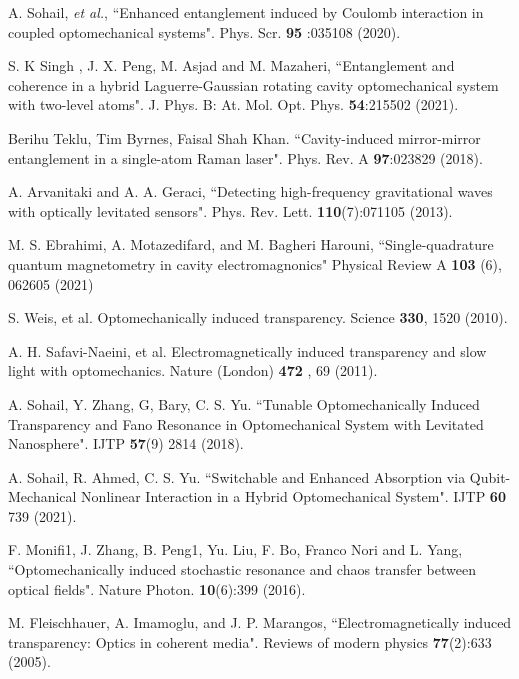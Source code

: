 \documentclass[aps,pra,superscriptaddress,balancelastpage,twocolumn]{revtex4}
\begin{document}
\begin{thebibliography}{99}
 A. Sohail, \textit{et al.}, ``Enhanced entanglement induced by
Coulomb interaction in coupled optomechanical systems". Phys. Scr. \textbf{95%
}:035108 (2020).

 S. K Singh , J. X. Peng, M. Asjad and M. Mazaheri,
``Entanglement and coherence in a hybrid Laguerre-Gaussian rotating cavity
optomechanical system with two-level atoms". J. Phys. B: At. Mol. Opt. Phys.
\textbf{54}:215502 (2021).

 Berihu Teklu, Tim Byrnes, Faisal Shah Khan. ``Cavity-induced
mirror-mirror entanglement in a single-atom Raman laser". Phys. Rev. A
\textbf{97}:023829 (2018).

 A. Arvanitaki and A. A. Geraci, ``Detecting high-frequency
gravitational waves with optically levitated sensors". Phys. Rev. Lett.
\textbf{110}(7):071105 (2013).

 M. S. Ebrahimi, A. Motazedifard, and M. Bagheri Harouni,
``Single-quadrature quantum magnetometry in cavity electromagnonics"
Physical Review A \textbf{103} (6), 062605 (2021)

 S. Weis, et al. Optomechanically induced transparency. Science
\textbf{330}, 1520 (2010).

 A. H. Safavi-Naeini, et al. Electromagnetically induced
transparency and slow light with optomechanics. Nature (London) \textbf{472}%
, 69 (2011).

 A. Sohail, Y. Zhang, G, Bary, C. S. Yu. ``Tunable
Optomechanically Induced Transparency and Fano Resonance in Optomechanical
System with Levitated Nanosphere". IJTP \textbf{57}(9) 2814 (2018).

 A. Sohail, R. Ahmed, C. S. Yu. ``Switchable and Enhanced
Absorption via Qubit-Mechanical Nonlinear Interaction in a Hybrid
Optomechanical System". IJTP \textbf{60} 739 (2021).


 F. Monifi1, J. Zhang, B. Peng1, Yu. Liu, F. Bo, Franco Nori
and L. Yang, ``Optomechanically induced stochastic resonance and chaos
transfer between optical fields". Nature Photon. \textbf{10}(6):399 (2016).

 M. Fleischhauer, A. Imamoglu, and J. P. Marangos,
``Electromagnetically induced transparency: Optics in coherent media".
Reviews of modern physics \textbf{77}(2):633 (2005).


\end{thebibliography}
\end{document}
